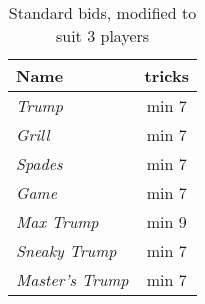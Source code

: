 %
%
%
%

\begin{table}
	\caption{Standard bids, modified to suit $3$ players}\label{tab:standardBids3}
	\begin{center}
		\begin{tabular}{l|c}
			\textbf{Name} & \textbf{tricks}
			\\ \hline
			\textit{Trump} & min 7 \\
			\textit{Grill} & min 7 \\
			\textit{Spades} & min 7 \\
			\textit{Game} & min 7 \\
			\textit{Max Trump} & min 9 \\
			\textit{Sneaky Trump} & min 7 \\
			\textit{Master's Trump} & min 7
		\end{tabular}
	\end{center}
\end{table}
